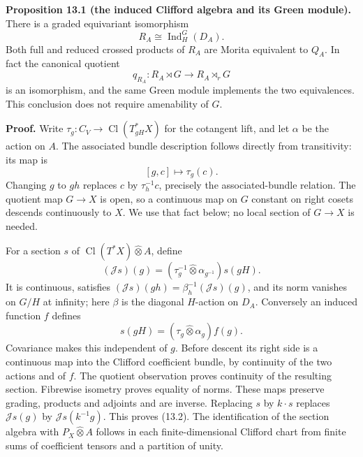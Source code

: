 \documentclass[
  11pt,
]{article}
\begin{document}
\textbf{Proposition 13.1 (the induced Clifford algebra and its Green
module).} There is a graded equivariant isomorphism \[
R_A\cong\operatorname{Ind}_H^G(D_A).
\tag{13.2}
\] Both full and reduced crossed products of \(R_A\) are Morita
equivalent to \(Q_A\). In fact the canonical quotient \[
q_{R_A}:R_A\rtimes G\longrightarrow R_A\rtimes_rG
\tag{13.3}
\] is an isomorphism, and the same Green module implements the two
equivalences. This conclusion does not require amenability of \(G\).

\textbf{Proof.} Write \(\tau_g:C_V\to\operatorname{Cl}(T_{gH}^*X)\) for
the cotangent lift, and let \(\alpha\) be the action on \(A\). The
associated bundle description follows directly from transitivity: its
map is \[
[g,c]\longmapsto\tau_g(c).
\tag{13.4}
\] Changing \(g\) to \(gh\) replaces \(c\) by \(\tau_h^{-1}c\),
precisely the associated-bundle relation. The quotient map \(G\to X\) is
open, so a continuous map on \(G\) constant on right cosets descends
continuously to \(X\). We use that fact below; no local section of
\(G\to X\) is needed.

For a section \(s\) of \(\operatorname{Cl}(T^*X)\widehat\otimes A\),
define \[
(\mathcal Js)(g)
 =(\tau_g^{-1}\widehat\otimes\alpha_{g^{-1}})s(gH).
\tag{13.5}
\] It is continuous, satisfies
\((\mathcal Js)(gh)=\beta_h^{-1}(\mathcal Js)(g)\), and its norm
vanishes on \(G/H\) at infinity; here \(\beta\) is the diagonal
\(H\)-action on \(D_A\). Conversely an induced function \(f\) defines \[
s(gH)=(\tau_g\widehat\otimes\alpha_g)f(g).
\tag{13.6}
\] Covariance makes this independent of \(g\). Before descent its right
side is a continuous map into the Clifford coefficient bundle, by
continuity of the two actions and of \(f\). The quotient observation
proves continuity of the resulting section. Fibrewise isometry proves
equality of norms. These maps preserve grading, products and adjoints
and are inverse. Replacing \(s\) by \(k\cdot s\) replaces
\(\mathcal Js(g)\) by \(\mathcal Js(k^{-1}g)\). This proves (13.2). The
identification of the section algebra with \(P_X\widehat\otimes A\)
follows in each finite-dimensional Clifford chart from finite sums of
coefficient tensors and a partition of unity.
\end{document}
